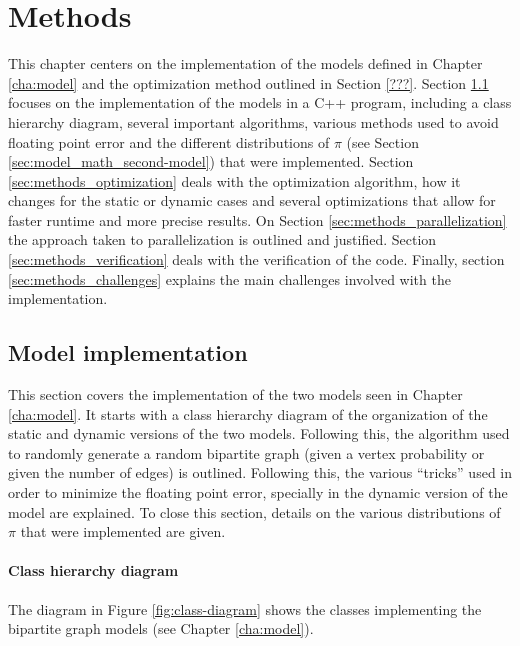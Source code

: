 \chapter{Methods}
\label{cha:methods}

This chapter centers on the implementation of the models defined in Chapter \ref{cha:model} and the optimization method outlined in Section \ref{???}.
Section \ref{sec:methods_model-implementation} focuses on the implementation of the models in a C++ program, including a class hierarchy diagram, several important algorithms, various methods used to avoid floating point error and the different distributions of $\pi$ (see Section \ref{sec:model_math_second-model}) that were implemented.
Section \ref{sec:methods_optimization} deals with the optimization algorithm, how it changes for the static or dynamic cases and several optimizations that allow for faster runtime and more precise results.
On Section \ref{sec:methods_parallelization} the approach taken to parallelization is outlined and justified.
Section \ref{sec:methods_verification} deals with the verification of the code.
Finally, section \ref{sec:methods_challenges} explains the main challenges involved with the implementation.

\section{Model implementation}
\label{sec:methods_model-implementation}

This section covers the implementation of the two models seen in Chapter \ref{cha:model}.
It starts with a class hierarchy diagram of the organization of the static and dynamic versions of the two models.
Following this, the algorithm used to randomly generate a random bipartite graph (given a vertex probability or given the number of edges) is outlined.
Following this, the various ``tricks'' used in order to minimize the floating point error, specially in the dynamic version of the model are explained.
To close this section, details on the various distributions of $\pi$ that were implemented are given.

\subsubsection{Class hierarchy diagram}

The diagram in Figure \ref{fig:class-diagram} shows the classes implementing the bipartite graph models (see Chapter \ref{cha:model}).

